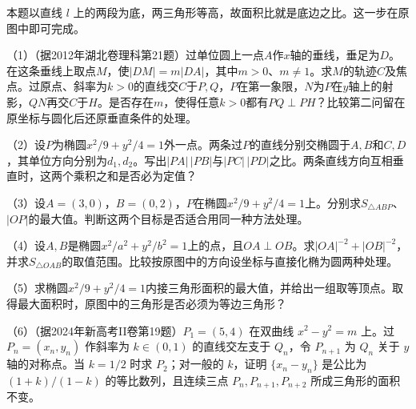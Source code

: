 本题以直线 \(l\) 上的两段为底，两三角形等高，故面积比就是底边之比。这一步在原图中即可完成。

\begin{exercise}
\mbox{}\par\nobreak

\begin{samepage}
（1）（据2012年湖北卷理科第21题）过单位圆上一点\(A\)作\(x\)轴的垂线，垂足为\(D\)。在这条垂线上取点\(M\)，使\(|DM|=m|DA|\)，其中\(m>0\)、\(m\ne1\)。求\(M\)的轨迹\(C\)及焦点。过原点、斜率为\(k>0\)的直线交\(C\)于\(P,Q\)，\(P\)在第一象限，\(N\)为\(P\)在\(y\)轴上的射影，\(QN\)再交\(C\)于\(H\)。是否存在\(m\)，使得任意\(k>0\)都有\(PQ\perp PH\)？比较第二问留在原坐标与圆化后还原垂直条件的处理。
\par
\end{samepage}

\begin{samepage}
（2）设\(P\)为椭圆\(x^2/9+y^2/4=1\)外一点。两条过\(P\)的直线分别交椭圆于\(A,B\)和\(C,D\)，其单位方向分别为\(d_1,d_2\)。写出\(|PA|\,|PB|\)与\(|PC|\,|PD|\)之比。两条直线方向互相垂直时，这两个乘积之和是否必为定值？
\par
\end{samepage}

\begin{samepage}
（3）设\(A=(3,0)\)，\(B=(0,2)\)，\(P\)在椭圆\(x^2/9+y^2/4=1\)上。分别求\(S_{\triangle ABP}\)、\(|OP|\)的最大值。判断这两个目标是否适合用同一种方法处理。
\par
\end{samepage}

\begin{samepage}
（4）设\(A,B\)是椭圆\(x^2/a^2+y^2/b^2=1\)上的点，且\(OA\perp OB\)。求\(|OA|^{-2}+|OB|^{-2}\)，并求\(S_{\triangle OAB}\)的取值范围。比较按原图中的方向设坐标与直接化椭为圆两种处理。
\par
\end{samepage}

\begin{samepage}
（5）求椭圆\(x^2/9+y^2/4=1\)内接三角形面积的最大值，并给出一组取等顶点。取得最大面积时，原图中的三角形是否必须为等边三角形？
\par
\end{samepage}
\begin{samepage}
（6）（据2024年新高考II卷第19题）\(P_1=(5,4)\) 在双曲线 \(x^2-y^2=m\) 上。过 \(P_n=(x_n,y_n)\) 作斜率为 \(k\in(0,1)\) 的直线交左支于 \(Q_n\)，令 \(P_{n+1}\) 为 \(Q_n\) 关于 \(y\) 轴的对称点。当 \(k=1/2\) 时求 \(P_2\)；对一般的 \(k\)，证明 \(\{x_n-y_n\}\) 是公比为 \((1+k)/(1-k)\) 的等比数列，且连续三点 \(P_n,P_{n+1},P_{n+2}\) 所成三角形的面积不变。
\par
\end{samepage}
\end{exercise}

